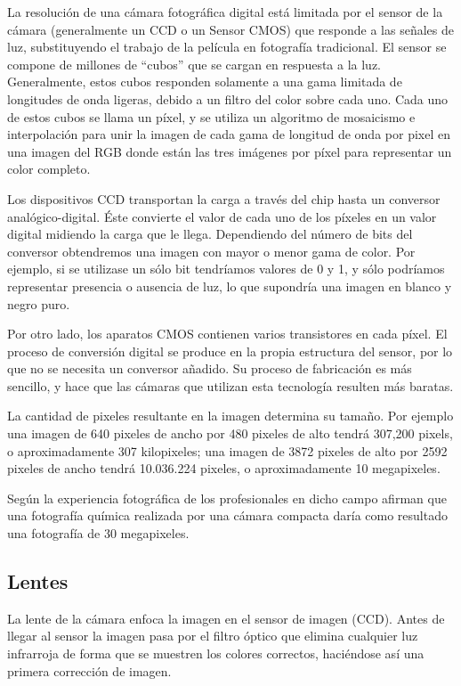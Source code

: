 \documentclass[12pt,a4paper]{report}
\begin{document}
La resolución de una cámara fotográfica digital está limitada por el sensor de
la cámara (generalmente un CCD o un Sensor CMOS) que responde a las señales de
luz, substituyendo el trabajo de la película en fotografía tradicional. El
sensor se compone de millones de “cubos” que se cargan en respuesta a la luz.
Generalmente, estos cubos responden solamente a una gama limitada de longitudes
de onda ligeras, debido a un filtro del color sobre cada uno. Cada uno de estos
cubos se llama un píxel, y se utiliza un algoritmo de mosaicismo e interpolación
para unir la imagen de cada gama de longitud de onda por pixel en una imagen del
RGB donde están las tres imágenes por píxel para representar un color completo.

Los dispositivos CCD transportan la carga a través del chip hasta un conversor
analógico-digital. Éste convierte el valor de cada uno de los píxeles en un
valor digital midiendo la carga que le llega. Dependiendo del número de bits del
conversor obtendremos una imagen con mayor o menor gama de color. Por ejemplo,
si se utilizase un sólo bit tendríamos valores de 0 y 1, y sólo podríamos
representar presencia o ausencia de luz, lo que supondría una imagen en blanco y
negro puro.

Por otro lado, los aparatos CMOS contienen varios transistores en cada píxel. El
proceso de conversión digital se produce en la propia estructura del sensor, por
lo que no se necesita un conversor añadido. Su proceso de fabricación es más
sencillo, y hace que las cámaras que utilizan esta tecnología resulten más
baratas.

La cantidad de pixeles resultante en la imagen determina su tamaño. Por ejemplo
una imagen de 640 pixeles de ancho por 480 pixeles de alto tendrá 307,200
pixels, o aproximadamente 307 kilopixeles; una imagen de 3872 pixeles de alto
por 2592 pixeles de ancho tendrá 10.036.224 pixeles, o aproximadamente 10
megapixeles.

Según la experiencia fotográfica de los profesionales en dicho campo afirman que
una fotografía química realizada por una cámara compacta daría como resultado
una fotografía de 30 megapixeles.

\subsection{Lentes}

La lente de la cámara enfoca la imagen en el sensor de imagen
(CCD). Antes de llegar al sensor la imagen pasa por el filtro óptico que
elimina cualquier luz infrarroja de forma que se muestren los colores
correctos, haciéndose así una primera corrección de imagen.
\end{document}
